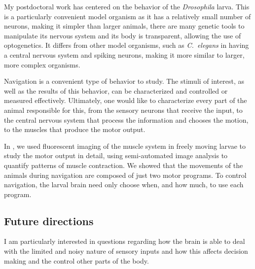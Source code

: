 \documentclass[12pt]{article}
\begin{document}
My postdoctoral work has centered on the behavior of the \emph{Drosophila} larva. This is a particularly convenient model organism as it has a relatively small number of neurons, making it simpler than larger animals, there are many genetic tools to manipulate its nervous system and its body is transparent, allowing the use of optogenetics. It differs from other model organisms, such as \emph{C.\ elegans} in having a central nervous system and spiking neurons, making it more similar to larger, more complex organisms.

Navigation is a convenient type of behavior to study. The stimuli of interest, as well as the results of this behavior, can be characterized and controlled or measured effectively. Ultimately, one would like to characterize every part of the animal responsible for this, from the sensory neurons that receive the input, to the central nervous system that process the information and chooses the motion, to the muscles that produce the motor output.

In \cite{Lahiri2011}, we used fluorescent imaging of the muscle system in freely moving larvae to study the motor output in detail, using semi-automated image analysis to quantify patterns of muscle contraction. We showed that the movements of the animals during navigation are composed of just two motor programs. To control navigation, the larval brain need only choose when, and how much, to use each program.

\subsection*{Future directions}

I am particularly interested in questions regarding how the brain is able to deal with the limited and noisy nature of sensory inputs and how this affects decision making and the control other parts of the body.















\end{document}
